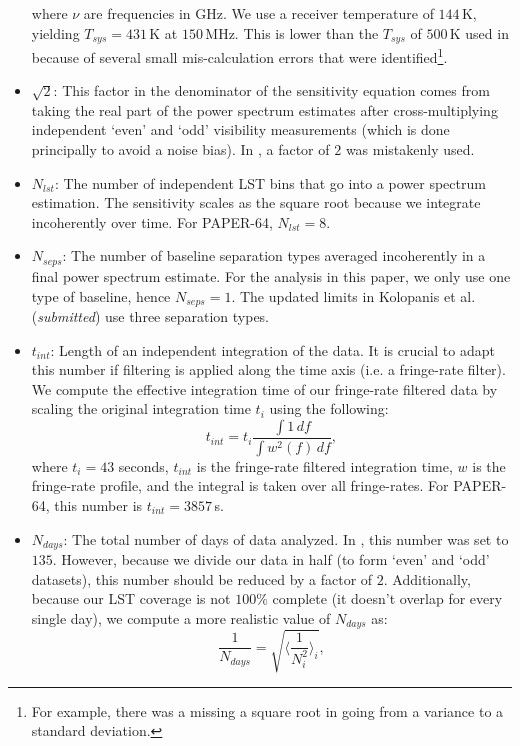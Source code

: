 \documentclass[preprint2,numberedappendix,tighten]{aastex6}  %
\begin{document}
\begin{itemize}
where $\nu$ are frequencies in GHz. We use a receiver temperature of $144$\,K, yielding $T_{sys} = 431$\,K at $150$\,MHz. 
This is lower than the $T_{sys}$ of $500$\,K used in  because of several small mis-calculation errors that were 
identified\footnote{For example, there was a missing a square root in going from a variance to a standard deviation.}.
\item $\sqrt{2}$: This factor in the denominator of the sensitivity equation comes from taking the real part of the power spectrum 
estimates after cross-multiplying independent `even' and `odd' visibility measurements (which is done principally to avoid a noise bias). In , a factor of $2$ was mistakenly used.
\item $N_{lst}$: The number of independent LST bins that go into a power spectrum estimation. The sensitivity scales as the square root 
because we integrate incoherently over time. For PAPER-64, $N_{lst} = 8$.
\item $N_{seps}$: The number of baseline separation types averaged incoherently in a final power spectrum estimate. For the 
analysis in this paper, we only use one type of baseline, hence $N_{seps}=1$. The updated limits in Kolopanis et al. (\textit{submitted})
use three separation types.
\item $t_{int}$: Length of an independent integration of the data. It is crucial to adapt this number if filtering is applied along the time axis (i.e. a 
fringe-rate filter). We compute the effective integration time of our fringe-rate filtered data by scaling the original integration time $t_{i}$
using the following:
\begin{equation}
t_{int} = t_{i} \frac{\int1 \, df}{\int w^{2}(f) \,df},
\end{equation}
where $t_{i}=43$ seconds, $t_{int}$ is the fringe-rate filtered integration time, $w$ is the fringe-rate profile, and the integral is 
taken over all fringe-rates. For PAPER-64, this number is $t_{int} = 3857$\,s. 
\item $N_{days}$: The total number of days of data analyzed. In , this number was set to $135$. However, because we 
divide our data in half (to form `even' and `odd' datasets), this number should be reduced by a factor of $2$. Additionally, 
because our LST coverage is not $100\%$ complete (it doesn't overlap for every single day), we compute a more realistic value of 
$N_{days}$ as:
\begin{equation}
 \frac{1}{N_{days}} = \sqrt{\Big\langle\frac{1}{N_{i}^{2}} \Big\rangle_{i}},

\end{equation}
\end{itemize}
\end{document}
